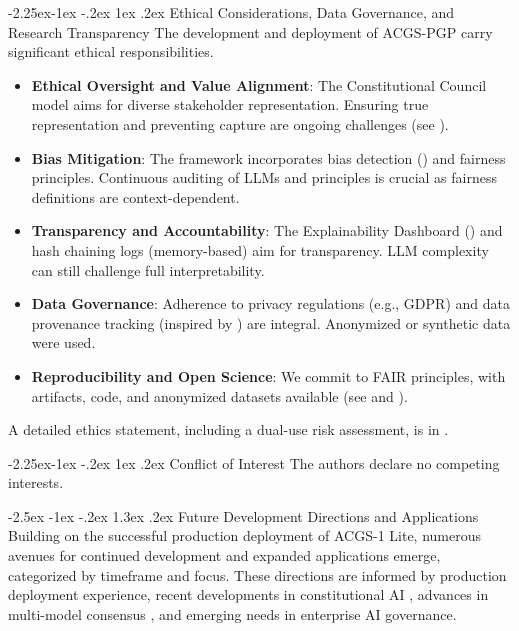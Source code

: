 \documentclass[manuscript,screen,9pt]{acmart}
\makeatletter
\renewcommand\section{\@startsection{section}{1}{\z@}%
  {-2.5ex \@plus -1ex \@minus -.2ex}%
  {1.3ex \@plus.2ex}%
  {\normalfont\Large\bfseries}}
\renewcommand\subsection{\@startsection{subsection}{2}{\z@}%
  {-2.25ex\@plus -1ex \@minus -.2ex}%
  {1ex \@plus .2ex}%
  {\normalfont\large\bfseries}}
\makeatother
\begin{document}
\subsection{Ethical Considerations, Data Governance, and Research Transparency}
\label{subsec:ethics_governance_reproducibility}
The development and deployment of ACGS-PGP carry significant ethical responsibilities.
\begin{itemize}[leftmargin=*,itemsep=1pt,parsep=1pt]
	\item \textbf{Ethical Oversight and Value Alignment}: The Constitutional Council model aims for diverse stakeholder representation. Ensuring true representation and preventing capture are ongoing challenges (see ).
	\item \textbf{Bias Mitigation}: The framework incorporates bias detection () and fairness principles. Continuous auditing of LLMs and principles is crucial as fairness definitions are context-dependent.
	\item \textbf{Transparency and Accountability}: The Explainability Dashboard () and hash chaining logs (memory-based) aim for transparency. LLM complexity can still challenge full interpretability.
	\item \textbf{Data Governance}: Adherence to privacy regulations (e.g., GDPR) and data provenance tracking (inspired by \cite{Gebru2021DatasheetDatasets}) are integral. Anonymized or synthetic data were used.
	\item \textbf{Reproducibility and Open Science}: We commit to FAIR principles, with artifacts, code, and anonymized datasets available (see  and ).
\end{itemize}
A detailed ethics statement, including a dual-use risk assessment, is in .

\subsection{Conflict of Interest}
The authors declare no competing interests.

\section{Future Development Directions and Applications}
\label{sec:future_work}
Building on the successful production deployment of ACGS-1 Lite, numerous avenues for continued development and expanded applications emerge, categorized by timeframe and focus. These directions are informed by production deployment experience, recent developments in constitutional AI \citep{Abiri2024PublicConstitutionalAI, C3AI2025Framework}, advances in multi-model consensus \citep{Naik2024ProbabilisticConsensus}, and emerging needs in enterprise AI governance.
\end{document}
